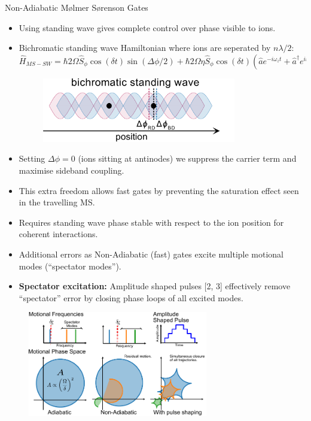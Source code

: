 \documentclass[final]{beamer}
\begin{document}
\begin{frame}{}
\begin{center}
\begin{columns}[t]
\begin{column}{0.49\textwidth}
\begin{alertblock}{Non-Adiabatic Mølmer Sørenson Gates}

     \vspace*{-4.5em}
      \begin{itemize}
      \item Using standing wave gives complete control over phase
        visible to ions.
      \item Bichromatic standing wave Hamiltonian where ions are
        seperated by $n\lambda/2$:
      \large$$ \hat{H}_{MS-SW} = \hbar 2\Omega \hat{S}_{\phi}\cos{(\delta t)}\sin{(\Delta\phi/2)} + \hbar 2\Omega\eta \hat{S}_\phi\cos{(\delta t)}(\hat{a}e^{-i\omega_zt} + \hat{a}^\dagger e^{i\omega_zt})\cos{(\Delta\phi/2)}$$\normalsize
      \begin{figure}
        \includegraphics[width=0.8\textwidth]{./figs/bichro.pdf}
      \end{figure}
      \item Setting $\Delta\phi = 0$ (ions sitting at antinodes) we
        suppress the carrier term and maximise sideband
        coupling.
      \item This extra freedom allows fast gates by preventing the
        saturation effect seen in the travelling MS.
      \item Requires standing wave phase stable with respect to the ion position for 
            coherent interactions.\\

      \item Additional errors as Non-Adiabatic (fast) gates excite multiple motional modes (``spectator modes''). 
      \item \textbf{Spectator excitation:} Amplitude shaped pulses
        [2, 3] effectively remove ``spectator'' error by closing
        phase loops of all excited modes.
      \end{itemize}
      \begin{figure}
        \includegraphics[width=0.7\textwidth]{./figs/phase_loops_fig_bumpy.pdf}
      \end{figure}
    \end{alertblock}


\end{column}
\end{columns}
\end{center}
\end{frame}
\end{document}
